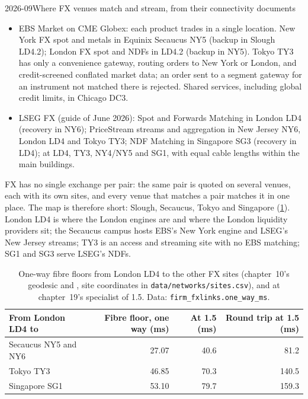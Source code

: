 \begin{dated}{2026-09}{Where FX venues match and stream, from their connectivity documents}\label{dat:nw:fx-connectivity:sites}
\begin{itemize}
\item EBS Market on CME Globex: each product trades in a single location. New York FX spot and metals in Equinix Secaucus NY5
  (backup in Slough LD4.2); London FX spot and NDFs in LD4.2 (backup in NY5). Tokyo TY3 has only a convenience gateway, routing
  orders to New York or London, and credit-screened conflated market data; an order sent to a segment gateway for an instrument
  not matched there is rejected. Shared services, including global credit limits, in Chicago DC3.
\item LSEG FX (guide of June 2026): Spot and Forwards Matching in London LD4 (recovery in NY6); PriceStream streams and
  aggregation in New Jersey NY6, London LD4 and Tokyo TY3; NDF Matching in Singapore SG3 (recovery in LD4); 
   at LD4, TY3, NY4/NY5 and SG1, with equal cable lengths within the main buildings.
\end{itemize}
\end{dated}

FX has no single exchange per pair: the same pair is quoted on several venues, each with its own sites, and every venue that
matches a pair matches it in one place. The map is therefore short: Slough, Secaucus, Tokyo and Singapore
(\cref{tab:nw:fx-connectivity:floors}). London LD4 is where the London engines are and where the London liquidity providers
sit; the Secaucus campus hosts EBS's New York engine and LSEG's New Jersey streams; TY3 is an access and streaming site with no
EBS matching; SG1 and SG3 serve LSEG's NDFs.

\begin{table}[ht]
\centering\small
\begin{tabular}{@{}lrrr@{}}
\toprule
From London LD4 to & Fibre floor, one way (ms) & At 1.5 (ms) & Round trip at 1.5 (ms) \\
\midrule
Secaucus NY5 and NY6 & 27.07 & 40.6 & 81.2 \\
Tokyo TY3 & 46.85 & 70.3 & 140.5 \\
Singapore SG1 & 53.10 & 79.7 & 159.3 \\
\bottomrule
\end{tabular}
\caption{One-way fibre floors from London LD4 to the other FX sites (chapter~10's geodesic and , site coordinates in
\texttt{data/networks/sites.csv}), and at chapter~19's specialist  of 1.5. Data: \texttt{firm\_fxlinks.one\_way\_ms}.}\label{tab:nw:fx-connectivity:floors}
\end{table}

